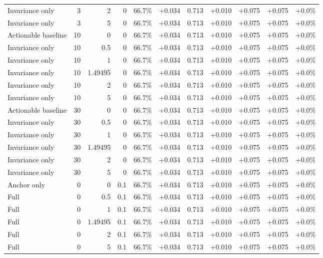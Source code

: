 \begin{table}[htbp]
\begin{tabular}{lrrrccccccc}
Invariance only & 3 & 2 & 0 & 66.7\% & +0.034 & 0.713 & +0.010 & +0.075 & +0.075 & +0.0\% \\
Invariance only & 3 & 5 & 0 & 66.7\% & +0.034 & 0.713 & +0.010 & +0.075 & +0.075 & +0.0\% \\
Actionable baseline & 10 & 0 & 0 & 66.7\% & +0.034 & 0.713 & +0.010 & +0.075 & +0.075 & +0.0\% \\
Invariance only & 10 & 0.5 & 0 & 66.7\% & +0.034 & 0.713 & +0.010 & +0.075 & +0.075 & +0.0\% \\
Invariance only & 10 & 1 & 0 & 66.7\% & +0.034 & 0.713 & +0.010 & +0.075 & +0.075 & +0.0\% \\
Invariance only & 10 & 1.49495 & 0 & 66.7\% & +0.034 & 0.713 & +0.010 & +0.075 & +0.075 & +0.0\% \\
Invariance only & 10 & 2 & 0 & 66.7\% & +0.034 & 0.713 & +0.010 & +0.075 & +0.075 & +0.0\% \\
Invariance only & 10 & 5 & 0 & 66.7\% & +0.034 & 0.713 & +0.010 & +0.075 & +0.075 & +0.0\% \\
Actionable baseline & 30 & 0 & 0 & 66.7\% & +0.034 & 0.713 & +0.010 & +0.075 & +0.075 & +0.0\% \\
Invariance only & 30 & 0.5 & 0 & 66.7\% & +0.034 & 0.713 & +0.010 & +0.075 & +0.075 & +0.0\% \\
Invariance only & 30 & 1 & 0 & 66.7\% & +0.034 & 0.713 & +0.010 & +0.075 & +0.075 & +0.0\% \\
Invariance only & 30 & 1.49495 & 0 & 66.7\% & +0.034 & 0.713 & +0.010 & +0.075 & +0.075 & +0.0\% \\
Invariance only & 30 & 2 & 0 & 66.7\% & +0.034 & 0.713 & +0.010 & +0.075 & +0.075 & +0.0\% \\
Invariance only & 30 & 5 & 0 & 66.7\% & +0.034 & 0.713 & +0.010 & +0.075 & +0.075 & +0.0\% \\
Anchor only & 0 & 0 & 0.1 & 66.7\% & +0.034 & 0.713 & +0.010 & +0.075 & +0.075 & +0.0\% \\
Full & 0 & 0.5 & 0.1 & 66.7\% & +0.034 & 0.713 & +0.010 & +0.075 & +0.075 & +0.0\% \\
Full & 0 & 1 & 0.1 & 66.7\% & +0.034 & 0.713 & +0.010 & +0.075 & +0.075 & +0.0\% \\
Full & 0 & 1.49495 & 0.1 & 66.7\% & +0.034 & 0.713 & +0.010 & +0.075 & +0.075 & +0.0\% \\
Full & 0 & 2 & 0.1 & 66.7\% & +0.034 & 0.713 & +0.010 & +0.075 & +0.075 & +0.0\% \\
Full & 0 & 5 & 0.1 & 66.7\% & +0.034 & 0.713 & +0.010 & +0.075 & +0.075 & +0.0\% \\

\end{tabular}
\end{table}

